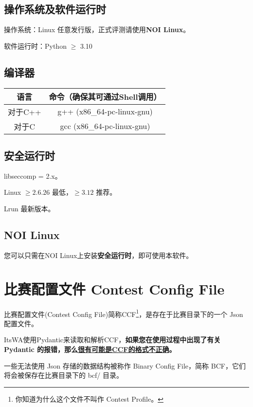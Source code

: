 \documentclass[UTF8]{ctexart}
\newcommand{\itswa}{ItsWA}
\begin{document}
        \subsection{操作系统及软件运行时}
            操作系统：Linux 任意发行版，正式评测请使用\textbf{NOI Linux}。

            软件运行时：Python $\geq$ 3.10

        \subsection{编译器}
            \begin{tabular}{|c|c|}
                \hline
                \textbf{语言} & \textbf{命令（确保其可通过Shell调用）} \\
                \hline
                对于C++ & g++ (x86\_64-pc-linux-gnu) \\
                \hline
                对于C & gcc \space \space (x86\_64-pc-linux-gnu) \\
                \hline
            \end{tabular}

        \subsection{安全运行时}
            libseccomp = 2.x。

            Linux $\ge 2.6.26$ 最低，$\ge 3.12$ 推荐。

            Lrun 最新版本。
        
        \subsection{NOI Linux}
            您可以只需在NOI Linux上安装\textbf{安全运行时}，即可使用本软件。
    
    \section{比赛配置文件 Contest Config File}
        比赛配置文件(Contest Config File)简称CCF\footnote{你知道为什么这个文件不叫作 Contest Profile。}，是存在于比赛目录下的一个 Json 配置文件。

        \itswa 使用Pydantic来读取和解析CCF，\textbf{如果您在使用过程中出现了有关 Pydantic 的报错，那么\uline{很有可能是CCF的格式不正确}。}
        
        一些无法使用 Json 存储的数据结构被称作 Binary Config File，简称 BCF，它们将会被保存在比赛目录下的 bcf/ 目录。
\end{document}
